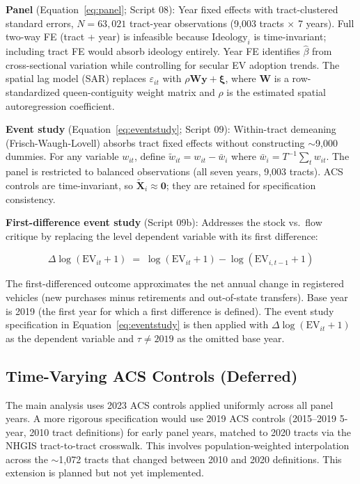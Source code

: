 \documentclass[12pt]{article}
\begin{document}
\textbf{Panel} (Equation~\ref{eq:panel}; Script 08): Year fixed effects with tract-clustered
standard errors, $N = 63{,}021$ tract-year observations (9,003 tracts $\times$ 7 years).
Full two-way FE (tract + year) is infeasible because $\text{Ideology}_i$ is
time-invariant; including tract FE would absorb ideology entirely. Year FE identifies
$\hat{\beta}$ from cross-sectional variation while controlling for secular EV adoption trends.
The spatial lag model (SAR) replaces $\varepsilon_{it}$ with $\rho \mathbf{W}\mathbf{y} + \boldsymbol{\xi}$,
where $\mathbf{W}$ is a row-standardized queen-contiguity weight matrix and $\rho$ is the
estimated spatial autoregression coefficient.

\textbf{Event study} (Equation~\ref{eq:eventstudy}; Script 09): Within-tract demeaning
(Frisch-Waugh-Lovell) absorbs tract fixed effects without constructing $\sim$9,000 dummies.
For any variable $w_{it}$, define $\tilde{w}_{it} = w_{it} - \bar{w}_i$ where
$\bar{w}_i = T^{-1}\sum_t w_{it}$. The panel is restricted to balanced observations
(all seven years, 9,003 tracts). ACS controls are time-invariant, so
$\tilde{\mathbf{X}}_i \approx \mathbf{0}$; they are retained for specification consistency.

\textbf{First-difference event study} (Script 09b): Addresses the stock vs.\ flow critique
by replacing the level dependent variable with its first difference:

\begin{equation}
  \Delta\log(\text{EV}_{it}+1) \;=\; \log(\text{EV}_{it}+1) - \log(\text{EV}_{i,t-1}+1)
  \label{eq:fd}
\end{equation}

The first-differenced outcome approximates the net annual change in registered vehicles
(new purchases minus retirements and out-of-state transfers). Base year is 2019 (the
first year for which a first difference is defined). The event study specification in
Equation~\ref{eq:eventstudy} is then applied with $\Delta\log(\text{EV}_{it}+1)$ as the
dependent variable and $\tau \neq 2019$ as the omitted base year.

\subsection{Time-Varying ACS Controls (Deferred)}

The main analysis uses 2023 ACS controls applied uniformly across all panel years.
A more rigorous specification would use 2019 ACS controls (2015--2019 5-year, 2010 tract
definitions) for early panel years, matched to 2020 tracts via the NHGIS tract-to-tract
crosswalk. This involves population-weighted interpolation across the $\sim$1,072 tracts
that changed between 2010 and 2020 definitions. This extension is planned but not yet
implemented.
\end{document}
